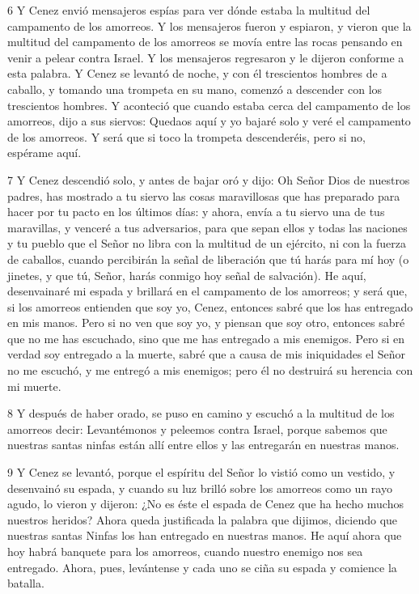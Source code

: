 \par 6 Y Cenez envió mensajeros espías para ver dónde estaba la multitud del campamento de los amorreos. Y los mensajeros fueron y espiaron, y vieron que la multitud del campamento de los amorreos se movía entre las rocas pensando en venir a pelear contra Israel. Y los mensajeros regresaron y le dijeron conforme a esta palabra. Y Cenez se levantó de noche, y con él trescientos hombres de a caballo, y tomando una trompeta en su mano, comenzó a descender con los trescientos hombres. Y aconteció que cuando estaba cerca del campamento de los amorreos, dijo a sus siervos: Quedaos aquí y yo bajaré solo y veré el campamento de los amorreos. Y será que si toco la trompeta descenderéis, pero si no, espérame aquí.

\par 7 Y Cenez descendió solo, y antes de bajar oró y dijo: Oh Señor Dios de nuestros padres, has mostrado a tu siervo las cosas maravillosas que has preparado para hacer por tu pacto en los últimos días: y ahora, envía a tu siervo una de tus maravillas, y venceré a tus adversarios, para que sepan ellos y todas las naciones y tu pueblo que el Señor no libra con la multitud de un ejército, ni con la fuerza de caballos, cuando percibirán la señal de liberación que tú harás para mí hoy (o jinetes, y que tú, Señor, harás conmigo hoy señal de salvación). He aquí, desenvainaré mi espada y brillará en el campamento de los amorreos; y será que, si los amorreos entienden que soy yo, Cenez, entonces sabré que los has entregado en mis manos. Pero si no ven que soy yo, y piensan que soy otro, entonces sabré que no me has escuchado, sino que me has entregado a mis enemigos. Pero si en verdad soy entregado a la muerte, sabré que a causa de mis iniquidades el Señor no me escuchó, y me entregó a mis enemigos; pero él no destruirá su herencia con mi muerte.

\par 8 Y después de haber orado, se puso en camino y escuchó a la multitud de los amorreos decir: Levantémonos y peleemos contra Israel, porque sabemos que nuestras santas ninfas están allí entre ellos y las entregarán en nuestras manos.

\par 9 Y Cenez se levantó, porque el espíritu del Señor lo vistió como un vestido, y desenvainó su espada, y cuando su luz brilló sobre los amorreos como un rayo agudo, lo vieron y dijeron: ¿No es éste el espada de Cenez que ha hecho muchos nuestros heridos? Ahora queda justificada la palabra que dijimos, diciendo que nuestras santas Ninfas los han entregado en nuestras manos. He aquí ahora que hoy habrá banquete para los amorreos, cuando nuestro enemigo nos sea entregado. Ahora, pues, levántense y cada uno se ciña su espada y comience la batalla.

